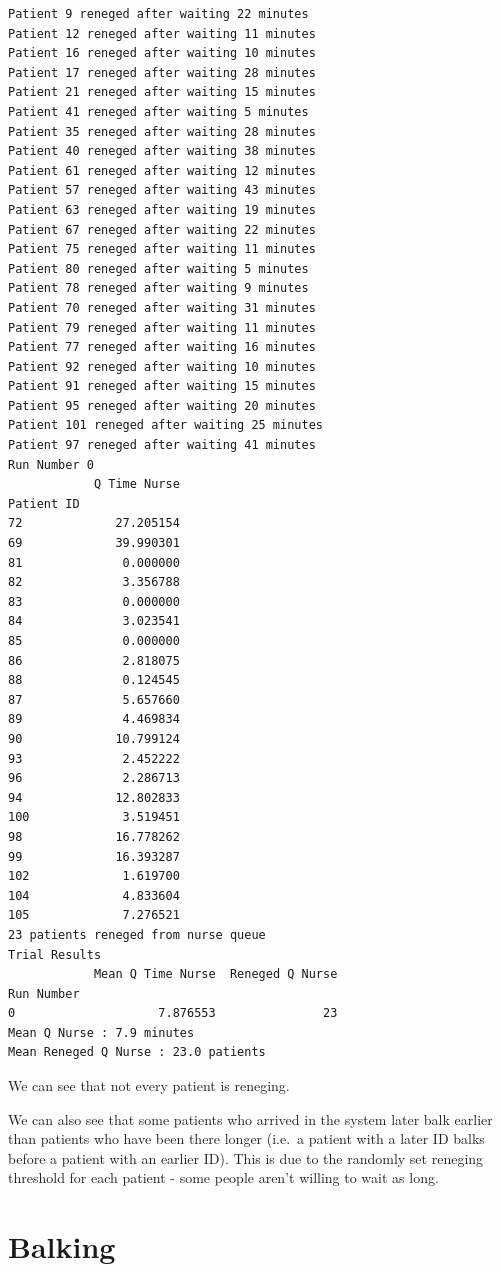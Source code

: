 \documentclass[
  letterpaper,
  DIV=11,
  numbers=noendperiod]{scrreprt}
\begin{document}
\begin{verbatim}
Patient 9 reneged after waiting 22 minutes
Patient 12 reneged after waiting 11 minutes
Patient 16 reneged after waiting 10 minutes
Patient 17 reneged after waiting 28 minutes
Patient 21 reneged after waiting 15 minutes
Patient 41 reneged after waiting 5 minutes
Patient 35 reneged after waiting 28 minutes
Patient 40 reneged after waiting 38 minutes
Patient 61 reneged after waiting 12 minutes
Patient 57 reneged after waiting 43 minutes
Patient 63 reneged after waiting 19 minutes
Patient 67 reneged after waiting 22 minutes
Patient 75 reneged after waiting 11 minutes
Patient 80 reneged after waiting 5 minutes
Patient 78 reneged after waiting 9 minutes
Patient 70 reneged after waiting 31 minutes
Patient 79 reneged after waiting 11 minutes
Patient 77 reneged after waiting 16 minutes
Patient 92 reneged after waiting 10 minutes
Patient 91 reneged after waiting 15 minutes
Patient 95 reneged after waiting 20 minutes
Patient 101 reneged after waiting 25 minutes
Patient 97 reneged after waiting 41 minutes
Run Number 0
            Q Time Nurse
Patient ID              
72             27.205154
69             39.990301
81              0.000000
82              3.356788
83              0.000000
84              3.023541
85              0.000000
86              2.818075
88              0.124545
87              5.657660
89              4.469834
90             10.799124
93              2.452222
96              2.286713
94             12.802833
100             3.519451
98             16.778262
99             16.393287
102             1.619700
104             4.833604
105             7.276521
23 patients reneged from nurse queue
Trial Results
            Mean Q Time Nurse  Reneged Q Nurse
Run Number                                    
0                    7.876553               23
Mean Q Nurse : 7.9 minutes
Mean Reneged Q Nurse : 23.0 patients
\end{verbatim}

We can see that not every patient is reneging.

We can also see that some patients who arrived in the system later balk
earlier than patients who have been there longer (i.e.~a patient with a
later ID balks before a patient with an earlier ID). This is due to the
randomly set reneging threshold for each patient - some people aren't
willing to wait as long.

\section{Balking}\label{balking}
\end{document}
